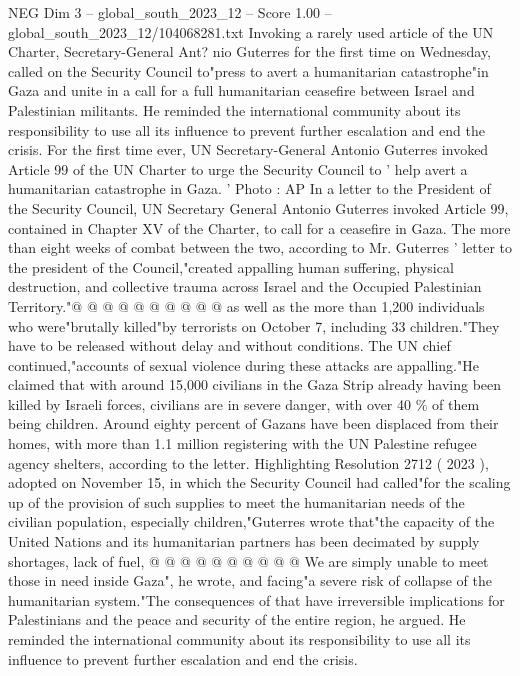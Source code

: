 \begin{textsample}{NEG Dim 3 – global\_south\_2023\_12 – Score 1.00 – global\_south\_2023\_12/104068281.txt}  \label{ex:f3_neg_005}
Invoking a rarely used article of the UN Charter, Secretary-General Ant? nio Guterres for the first time on Wednesday, called on the Security Council to"press to avert a humanitarian catastrophe"in Gaza and unite in a call for a full humanitarian ceasefire between Israel and Palestinian militants.
He reminded the international community about its responsibility to use all its influence to prevent further escalation and end the crisis.
For the first time ever, UN Secretary-General Antonio Guterres invoked Article 99 of the UN Charter to urge the Security Council to ' help avert a humanitarian catastrophe in Gaza. ' Photo : AP In a letter to the President of the Security Council, UN Secretary General Antonio Guterres invoked Article 99, contained in Chapter XV of the Charter, to call for a ceasefire in Gaza.
The more than eight weeks of combat between the two, according to Mr.
Guterres ' letter to the president of the Council,"created appalling human suffering, physical destruction, and collective trauma across Israel and the Occupied Palestinian Territory."@ @ @ @ @ @ @ @ @ @ as well as the more than 1,200 individuals who were"brutally killed"by terrorists on October 7, including 33 children."They have to be released without delay and without conditions.
The UN chief continued,"accounts of sexual violence during these attacks are appalling."He claimed that with around 15,000 civilians in the Gaza Strip already having been killed by Israeli forces, civilians are in severe danger, with over 40 \% of them being children.
Around eighty percent of Gazans have been displaced from their homes, with more than 1.1 million registering with the UN Palestine refugee agency shelters, according to the letter.
Highlighting Resolution 2712 ( 2023 ), adopted on November 15, in which the Security Council had called"for the scaling up of the provision of such supplies to meet the humanitarian needs of the civilian population, especially children,"Guterres wrote that"the capacity of the United Nations and its humanitarian partners has been decimated by supply shortages, lack of fuel, @ @ @ @ @ @ @ @ @ @ We are simply unable to meet those in need inside Gaza", he wrote, and facing"a severe risk of collapse of the humanitarian system."The consequences of that have irreversible implications for Palestinians and the peace and security of the entire region, he argued.
He reminded the international community about its responsibility to use all its influence to prevent further escalation and end the crisis.

\end{textsample}
